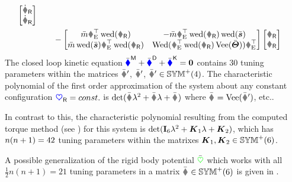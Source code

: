 \begin{subequations}
\begin{align}
 \begin{bmatrix} \vRd \\ \wRd \end{bmatrix}
\nonumber\\
 &\qquad
 - \begin{bmatrix} \mc\RE^\top\wedOp(\wR) & -\mc\RE^\top\wedOp(\wR)\wedOp(\sc) \\ \mc\wedOp(\sc)\RE^\top\wedOp(\wR) & \wedMatOp(\RE^\top\wedOp(\wR)\veeMatOp(\Jc))\RE^\top \end{bmatrix}  \begin{bmatrix} \vR \\ \wR \end{bmatrix}
\end{align}
\end{subequations}
The closed loop kinetic equation $\genForceInertiaC + \genForceDissC + \genForceStiffC = \tuple{0}$ contains 30 tuning parameters within the matrices $\bodyInertiaMatCp{}{}$, $\bodyDissMatCp{}{}$, $\bodyStiffMatCp{}{} \in \SymMatP(4)$.
The characteristic polynomial of the first order approximation of the system about any constant configuration $\sysCoordR=\const$ is $\det(\bodyInertiaMatC{}{} \lambda^2 + \bodyDissMatC{}{} \lambda + \bodyStiffMatC{}{})$ where $\bodyInertiaMatC{}{} = \veeMatOp(\bodyInertiaMatCp{}{})$, etc..


In contrast to this, the characteristic polynomial resulting from the computed torque method (see ) for this system is $\det(\idMat[6] \lambda^2 + \mat{K}_1 \lambda + \mat{K}_2)$, which has $\dimConfigSpace(\dimConfigSpace+1) = 42$ tuning parameters within the matrixes $\mat{K}_1,\mat{K}_2\in\SymMatP(6)$.


A possible generalization of the rigid body potential $\potentialEnergyC$ which works with all $\tfrac{1}{2}n(n+1) = 21$ tuning parameters in a matrix $\bodyStiffMatC{}{} \in \SymMatP(6)$ is given in .


